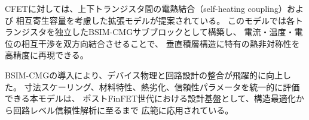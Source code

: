 CFETに対しては、上下トランジスタ間の電熱結合（self-heating coupling）および  
相互寄生容量を考慮した拡張モデルが提案されている。  
このモデルでは各トランジスタを独立したBSIM-CMGサブブロックとして構築し、  
電流・温度・電位の相互干渉を双方向結合させることで、  
垂直積層構造に特有の熱非対称性を高精度に再現できる。

BSIM-CMGの導入により、デバイス物理と回路設計の整合が飛躍的に向上した。  
寸法スケーリング、材料特性、熱劣化、信頼性パラメータを統一的に評価できる本モデルは、  
ポストFinFET世代における設計基盤として、構造最適化から回路レベル信頼性解析に至るまで  
広範に応用されている。  



